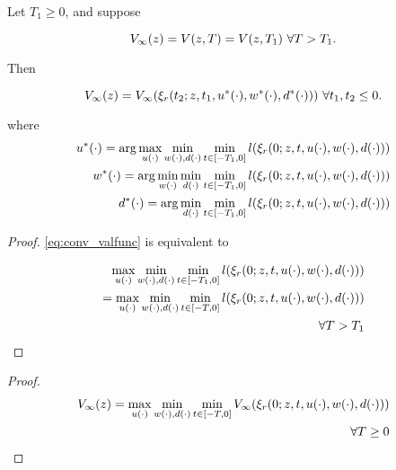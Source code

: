 \begin{thm}
Let $T_1 \ge 0$, and suppose

\begin{equation}
\label{eq:conv_valfunc}
V_\infty(z) = V(z, T) = V(z, T_1) ~ \forall T > T_1.
\end{equation}

Then

\begin{equation}
V_\infty(z) = V_\infty(\xi_r(t_2; z, t_1, u^*(\cdot), w^*(\cdot), d^*(\cdot))) ~ \forall t_1, t_2 \le 0.
\end{equation}

\noindent where
\begin{equation}
\begin{aligned}
u^*(\cdot) = \arg \max_{u(\cdot)} \min_{w(\cdot), d(\cdot)} \min_{t \in [-T_1, 0]} l(\xi_r(0; z, t, u(\cdot), w(\cdot), d(\cdot))) \\
w^*(\cdot) = \arg \min_{w(\cdot)} \min_{d(\cdot)} \min_{t \in [-T_1, 0]} l(\xi_r(0; z, t, u(\cdot), w(\cdot), d(\cdot))) \\
d^*(\cdot) = \arg \min_{d(\cdot)} \min_{t \in [-T_1, 0]} l(\xi_r(0; z, t, u(\cdot), w(\cdot), d(\cdot))) 
\end{aligned}
\end{equation}

\end{thm}

\begin{proof}
\eqref{eq:conv_valfunc} is equivalent to

\begin{equation}
\begin{aligned}
\max_{u(\cdot)} \min_{w(\cdot), d(\cdot)} \min_{t \in [-T_1, 0]} l(\xi_r(0; z, t, u(\cdot), w(\cdot), d(\cdot))) \\
= \max_{u(\cdot)} \min_{w(\cdot), d(\cdot)} \min_{t \in [-T, 0]} l(\xi_r(0; z, t, u(\cdot), w(\cdot), d(\cdot))) \\
\forall T > T_1
\end{aligned}
\end{equation}
\end{proof}

\begin{proof}
\begin{equation}
\begin{aligned}
V_\infty(z) = \max_{u(\cdot)} \min_{w(\cdot), d(\cdot)} \min_{t \in [-T, 0]} V_\infty(\xi_r(0; z, t, u(\cdot), w(\cdot), d(\cdot))) \\
\forall T \ge 0
\end{aligned}
\end{equation}

\end{proof}


